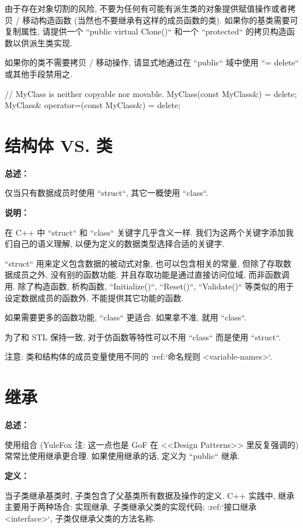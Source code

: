 由于存在对象切割的风险, 不要为任何有可能有派生类的对象提供赋值操作或者拷贝 / 移动构造函数 (当然也不要继承有这样的成员函数的类). 如果你的基类需要可复制属性, 请提供一个 ``public virtual Clone()`` 和一个 ``protected`` 的拷贝构造函数以供派生类实现.

如果你的类不需要拷贝 / 移动操作, 请显式地通过在 ``public`` 域中使用 ``= delete`` 或其他手段禁用之.

\begin{cppcode}
  // MyClass is neither copyable nor movable.
  MyClass(const MyClass&) = delete;
  MyClass& operator=(const MyClass&) = delete;
\end{cppcode}

\section{结构体 VS. 类} \label{structs-vs-classes}

\textbf{总述：}

仅当只有数据成员时使用 ``struct``, 其它一概使用 ``class``.

\textbf{说明：}

在 C++ 中 ``struct`` 和 ``class`` 关键字几乎含义一样. 我们为这两个关键字添加我们自己的语义理解, 以便为定义的数据类型选择合适的关键字.

``struct`` 用来定义包含数据的被动式对象, 也可以包含相关的常量, 但除了存取数据成员之外, 没有别的函数功能. 并且存取功能是通过直接访问位域, 而非函数调用. 除了构造函数, 析构函数, ``Initialize()``, ``Reset()``, ``Validate()`` 等类似的用于设定数据成员的函数外, 不能提供其它功能的函数.

如果需要更多的函数功能, ``class`` 更适合. 如果拿不准, 就用 ``class``.

为了和 STL 保持一致, 对于仿函数等特性可以不用 ``class`` 而是使用 ``struct``.

注意: 类和结构体的成员变量使用不同的 :ref:`命名规则 <variable-names>`.

\section{继承} \label{inheritance}

\textbf{总述：}

使用组合 (YuleFox 注: 这一点也是 GoF 在 <<Design Patterns>> 里反复强调的) 常常比使用继承更合理. 如果使用继承的话, 定义为 ``public`` 继承.

\textbf{定义：}

当子类继承基类时, 子类包含了父基类所有数据及操作的定义. C++ 实践中, 继承主要用于两种场合: 实现继承, 子类继承父类的实现代码; :ref:`接口继承 <interface>`, 子类仅继承父类的方法名称.

